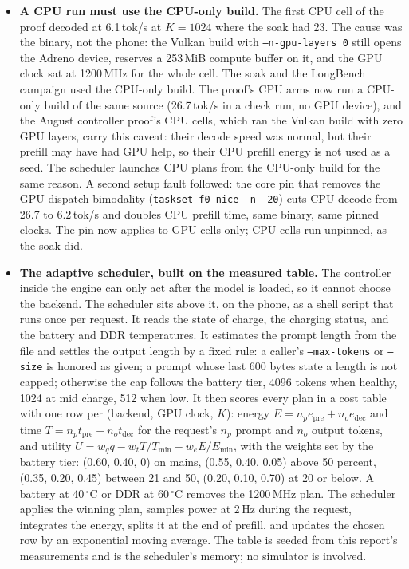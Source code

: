 \documentclass[11pt]{article}
\begin{document}
\begin{itemize}
\item \textbf{A CPU run must use the CPU-only build.} The first CPU cell of the proof decoded
at 6.1\,tok/s at $K{=}1024$ where the soak had 23. The cause was the binary, not the phone: the
Vulkan build with \texttt{--n-gpu-layers 0} still opens the Adreno device, reserves a 253\,MiB
compute buffer on it, and the GPU clock sat at 1200\,MHz for the whole cell. The soak and the
LongBench campaign used the CPU-only build. The proof's CPU arms now run a CPU-only build of
the same source (26.7\,tok/s in a check run, no GPU device), and the August controller proof's
CPU cells, which ran the Vulkan build with zero GPU layers, carry this caveat: their decode
speed was normal, but their prefill may have had GPU help, so their CPU prefill energy is not
used as a seed. The scheduler launches CPU plans from the CPU-only build for the same reason.
A second setup fault followed: the core pin that removes the GPU dispatch bimodality
(\texttt{taskset f0 nice -n -20}) cuts CPU decode from 26.7 to 6.2\,tok/s and doubles CPU
prefill time, same binary, same pinned clocks. The pin now applies to GPU cells only; CPU
cells run unpinned, as the soak did.

\item \textbf{The adaptive scheduler, built on the measured table.} The controller inside
the engine can only act after the model is loaded, so it cannot choose the backend. The
scheduler sits above it, on the phone, as a shell script that runs once per request. It
reads the state of charge, the charging status, and the battery and DDR temperatures. It
estimates the prompt length from the file and settles the output length by a fixed rule: a
caller's \texttt{--max-tokens} or \texttt{--size} is honored as given; a prompt whose last
600 bytes state a length is not capped; otherwise the cap follows the battery tier, 4096
tokens when healthy, 1024 at mid charge, 512 when low. It then scores every plan in a cost
table with one row per (backend, GPU clock, $K$): energy $E = n_p e_{\mathrm{pre}} + n_o
e_{\mathrm{dec}}$ and time $T = n_p t_{\mathrm{pre}} + n_o t_{\mathrm{dec}}$ for the
request's $n_p$ prompt and $n_o$ output tokens, and utility $U = w_q q - w_t T/T_{\min} -
w_e E/E_{\min}$, with the weights set by the battery tier: (0.60, 0.40, 0) on mains, (0.55,
0.40, 0.05) above 50 percent, (0.35, 0.20, 0.45) between 21 and 50, (0.20, 0.10, 0.70) at 20
or below. A battery at 40\,$^\circ$C or DDR at 60\,$^\circ$C removes the 1200\,MHz plan. The
scheduler applies the winning plan, samples power at 2\,Hz during the request, integrates
the energy, splits it at the end of prefill, and updates the chosen row by an exponential
moving average. The table is seeded from this report's measurements and is the scheduler's
memory; no simulator is involved.


\end{itemize}
\end{document}
